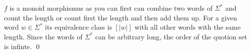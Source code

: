 \documentclass[a4paper,12pt,numbers=noenddot]{scrreport}
\begin{document}
\section{}
$f$ is a monoid morphismus as you can first can combine two words of $\Sigma^*$ and count the length or count first the length and then add them up.
For a given word $w \in \Sigma^*$ its equivalence class is $[|w|]$ with all other words with the same length.
Since the words of $\Sigma^*$ can be arbitrary long, the order of the quotion set is infinte.
\qed
\end{document}
